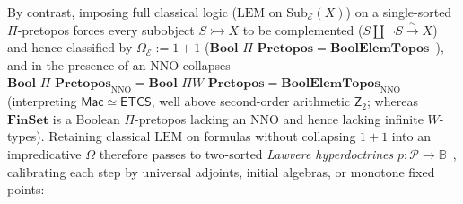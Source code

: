 \documentclass[10pt,twoside,openright]{book}
\theoremstyle{crmplain}
\theoremstyle{crmdef}
\theoremstyle{crmremark}
\begin{document}
By contrast, imposing full classical logic ($\mathrm{LEM}$ on $\mathrm{Sub}_{\mathcal{E}}(X)$) on a single-sorted $\Pi$-pretopos forces every subobject $S \rightarrowtail X$ to be complemented ($S \amalg \neg S \xrightarrow{\sim} X$) and hence classified by $\Omega_{\mathcal{E}} := 1 + 1$ ($\mathbf{Bool}\text{-}\Pi\text{-}\mathbf{Pretopos} = \mathbf{BoolElemTopos}$~\cite[Lemma~A1.4.3 \& Cor.~A2.1.6]{Johnstone02}), and in the presence of an $\mathrm{NNO}$ collapses $\mathbf{Bool}\text{-}\Pi\text{-}\mathbf{Pretopos}_{\mathrm{NNO}} = \mathbf{Bool}\text{-}\Pi W\text{-}\mathbf{Pretopos} = \mathbf{BoolElemTopos}_{\mathrm{NNO}}$ (interpreting $\mathsf{Mac} \simeq \mathsf{ETCS}$, well above second-order arithmetic $\mathsf{Z}_2$; whereas $\mathbf{FinSet}$ is a Boolean $\Pi$-pretopos lacking an $\mathrm{NNO}$ and hence lacking infinite $W$-types). Retaining classical $\mathrm{LEM}$ on formulas without collapsing $1 + 1$ into an impredicative $\Omega$ therefore passes to two-sorted \emph{Lawvere hyperdoctrines} $p : \mathcal{P} \to \mathbb{B}$~\cite{Lawvere69}, calibrating each step by universal adjoints, initial algebras, or monotone fixed points:
\end{document}
